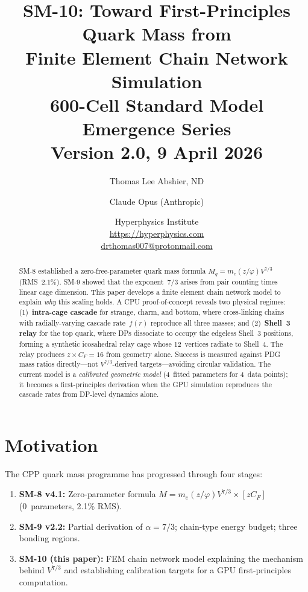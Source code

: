 \documentclass[11pt,letterpaper]{article}
\title{\textbf{SM-10: Toward First-Principles Quark Mass from\\Finite Element Chain Network Simulation}\\[6pt]
{\large 600-Cell Standard Model Emergence Series}\\[4pt]
{\normalsize Version 2.0, 9 April 2026}}
\author{Thomas Lee Abshier, ND \and Claude Opus (Anthropic)}
\date{\normalsize Hyperphysics Institute\\
\url{https://hyperphysics.com}\\
\href{mailto:drthomas007@protonmail.com}{drthomas007@protonmail.com}}
\newcommand{\phig}{\varphi}
\begin{document}
\maketitle

\begin{abstract}
SM-8 established a zero-free-parameter quark mass formula
$M_q = m_e(z/\phig)V^{7/3}$ (RMS~$2.1\%$).  SM-9 showed that
the exponent~$7/3$ arises from pair counting times linear cage
dimension.  This paper develops a finite element chain network
model to explain \emph{why} this scaling holds.  A CPU
proof-of-concept reveals two physical regimes:
(1)~\textbf{intra-cage cascade} for strange, charm, and bottom,
where cross-linking chains with radially-varying cascade
rate~$f(r)$ reproduce all three masses; and
(2)~\textbf{Shell~3 relay} for the top quark, where DPs
dissociate to occupy the edgeless Shell~3 positions, forming a
synthetic icosahedral relay cage whose 12~vertices radiate to
Shell~4.  The relay produces $z \times C_F = 16$ from geometry
alone.  Success is measured against PDG mass ratios
directly---not $V^{7/3}$-derived targets---avoiding circular
validation.  The current model is a \emph{calibrated geometric
model} (4~fitted parameters for 4~data points); it becomes a
first-principles derivation when the GPU simulation reproduces
the cascade rates from DP-level dynamics alone.
\end{abstract}

\tableofcontents
\newpage

\section{Motivation}

The CPP quark mass programme has progressed through four stages:
\begin{enumerate}
\item \textbf{SM-8 v4.1:} Zero-parameter formula
  $M = m_e(z/\phig)V^{7/3} \times [z C_F]$ (0~parameters,
  2.1\% RMS).
\item \textbf{SM-9 v2.2:} Partial derivation of $\alpha = 7/3$;
  chain-type energy budget; three bonding regions.
\item \textbf{SM-10 (this paper):} FEM chain network model
  explaining the mechanism behind $V^{7/3}$ and establishing
  calibration targets for a GPU first-principles computation.
\end{enumerate}
\end{document}
